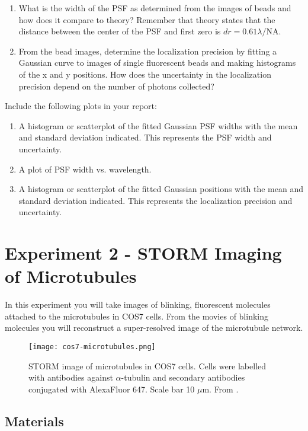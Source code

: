 \documentclass[10pt,a4paper,oneside]{book}
\begin{document}
\begin{enumerate}
    \item What is the width of the PSF as determined from the images of beads and how does it compare to theory? Remember that theory states that the distance between the center of the PSF and first zero is $dr = 0.61 \lambda / \text{NA}$.
    \item From the bead images, determine the localization precision by fitting a Gaussian curve to images of single fluorescent beads and making histograms of the x and y positions. How does the uncertainty in the localization precision depend on the number of photons collected?
\end{enumerate}

Include the following plots in your report:

\begin{enumerate}
    \item A histogram or scatterplot of the fitted Gaussian PSF widths with the mean and standard deviation indicated. This represents the PSF width and uncertainty.
    \item A plot of PSF width vs. wavelength.
    \item A histogram or scatterplot of the fitted Gaussian positions with the mean and standard deviation indicated. This represents the localization precision and uncertainty.
\end{enumerate}

\section{Experiment 2 - STORM Imaging of Microtubules}\label{sec:exp2}

In this experiment you will take images of blinking, fluorescent molecules attached to the microtubules in COS7 cells. From the movies of blinking molecules you will reconstruct a super-resolved image of the microtubule network.

\begin{figure}[ht]
    \centering
    \texttt{[image: cos7-microtubules.png]}
    \caption{STORM image of microtubules in COS7 cells. Cells were labelled with antibodies against $\alpha$-tubulin and secondary antibodies conjugated with AlexaFluor 647. Scale bar 10 $\mu$m. From \cite{douglass-naturephotonics-2016}.}
    \label{fig:cos7-microtubules}
\end{figure}

\subsection{Materials}
\end{document}
